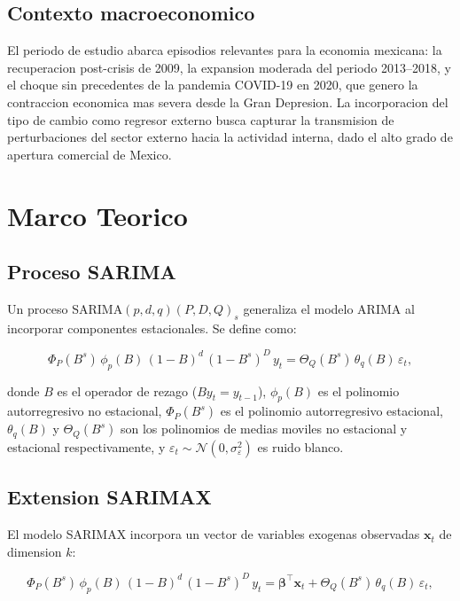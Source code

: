 \documentclass[12pt,a4paper]{article}
\begin{document}
\subsection{Contexto macroeconomico}

El periodo de estudio abarca episodios relevantes para la economia mexicana: la recuperacion post-crisis de 2009, la expansion moderada del periodo 2013--2018, y el choque sin precedentes de la pandemia COVID-19 en 2020, que genero la contraccion economica mas severa desde la Gran Depresion. La incorporacion del tipo de cambio como regresor externo busca capturar la transmision de perturbaciones del sector externo hacia la actividad interna, dado el alto grado de apertura comercial de Mexico.

\section{Marco Teorico}

\subsection{Proceso SARIMA}

Un proceso SARIMA$(p,d,q)(P,D,Q)_s$ generaliza el modelo ARIMA al incorporar componentes estacionales. Se define como:

\begin{equation}
  \Phi_P(B^s)\,\phi_p(B)\,(1-B)^d\,(1-B^s)^D\,y_t = \Theta_Q(B^s)\,\theta_q(B)\,\varepsilon_t,
  \label{eq:sarima}
\end{equation}

donde $B$ es el operador de rezago ($By_t = y_{t-1}$), $\phi_p(B)$ es el polinomio autorregresivo no estacional, $\Phi_P(B^s)$ es el polinomio autorregresivo estacional, $\theta_q(B)$ y $\Theta_Q(B^s)$ son los polinomios de medias moviles no estacional y estacional respectivamente, y $\varepsilon_t \sim \mathcal{N}(0,\sigma^2_\varepsilon)$ es ruido blanco.

\subsection{Extension SARIMAX}

El modelo SARIMAX incorpora un vector de variables exogenas observadas $\mathbf{x}_t$ de dimension $k$:

\begin{equation}
  \Phi_P(B^s)\,\phi_p(B)\,(1-B)^d\,(1-B^s)^D\,y_t = \boldsymbol{\beta}^\top\mathbf{x}_t + \Theta_Q(B^s)\,\theta_q(B)\,\varepsilon_t,
  \label{eq:sarimax}
\end{equation}
\end{document}
